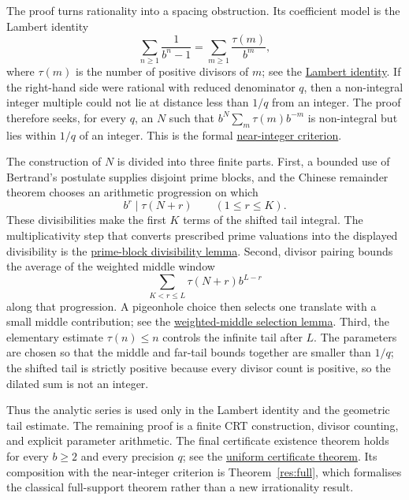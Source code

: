 \documentclass[11pt]{article}
\newcommand{\commit}{bb4e24651b37cd096d3749ef299c3317930b3a3b}
\newcommand{\repobase}{https://github.com/wcook04/plectis-lean-erdos249-257/blob/\commit}
\newcommand{\PK}{Erdos249257}
\newcommand{\lword}[4]{\href{\repobase/\PK/#1\#L#2}{#4}}
\theoremstyle{definition}
\theoremstyle{remark}
\begin{document}
The proof turns rationality into a spacing obstruction.  Its coefficient
model is the Lambert identity
\[
 \sum_{n\geq 1}\frac{1}{b^n-1}
   =\sum_{m\geq 1}\frac{\tau(m)}{b^m},
\]
where $\tau(m)$ is the number of positive divisors of $m$; see the
\lword{CertificateKernel.lean}{6193}{erdosSum_full_support_eq_tsum_divisor_count}{Lambert identity}.
If the right-hand side were rational with reduced denominator $q$, then a
non-integral integer multiple could not lie at distance less than $1/q$ from an
integer.  The proof therefore seeks, for every $q$, an $N$ such that
$b^N\sum_m\tau(m)b^{-m}$ is non-integral but lies within $1/q$ of an integer.
This is the formal
\lword{CertificateKernel.lean}{6120}{irrational_of_int_mul_near_int}{near-integer criterion}.

The construction of $N$ is divided into three finite parts.  First, a bounded
use of Bertrand's postulate supplies disjoint prime blocks, and the Chinese remainder
theorem chooses an arithmetic progression on which
\[
        b^r\mid \tau(N+r) \qquad (1\leq r\leq K).
\]
These divisibilities make the first $K$ terms of the shifted tail integral.
The multiplicativity step that converts prescribed prime valuations into the
displayed divisibility is the
\lword{CertificateKernel.lean}{6505}{bpow_dvd_card_divisors_of_exact_prime_block}{prime-block divisibility lemma}.
Second, divisor pairing bounds the average of the weighted middle window
\[
   \sum_{K<r\leq L}\tau(N+r)b^{L-r}
\]
along that progression.  A pigeonhole choice then selects one translate with a
small middle contribution; see the
\lword{CertificateKernel.lean}{7574}{exists_first_block_progression_with_selected_weighted_middle}{weighted-middle selection lemma}.
Third, the elementary estimate $\tau(n)\leq n$ controls the infinite tail after
$L$.  The parameters are chosen so that the middle and far-tail bounds together
are smaller than $1/q$; the shifted tail is strictly positive because every
divisor count is positive, so the dilated sum is not an integer.

Thus the analytic series is used only in the Lambert identity and the
geometric tail estimate.  The remaining proof is a finite CRT construction,
divisor counting, and explicit parameter arithmetic.  The final certificate
existence theorem holds for every $b\geq2$ and every precision $q$; see the
\lword{CertificateKernel.lean}{8187}{exists_weighted_block_certificates}{uniform certificate theorem}.
Its composition with the near-integer criterion is
Theorem~\ref{res:full}, which formalises the classical full-support theorem rather than a new
irrationality result.
\end{document}
